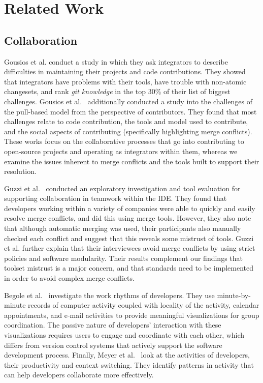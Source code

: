 
\section{Related Work}\label{related_work}

\subsection{Collaboration}

Gousios et al. \cite{integrator_perspective} conduct a study in which they ask integrators to describe difficulties in maintaining their projects and code contributions. 
They showed that integrators have problems with their tools, have trouble with non-atomic changesets, and rank \textit{git knowledge} in the top 30\% of their list of biggest challenges. 
Gousios et al.~\cite{gousios2016work} additionally conducted a study into the challenges of the pull-based model from the perspective of contributors. 
They found that most challenges relate to code contribution, the tools and model used to contribute, and the social aspects of contributing (specifically highlighting merge conflicts).
These works focus on the collaborative processes that go into contributing to open-source projects and operating as integrators within them, whereas we examine the issues inherent to merge conflicts and the tools built to support their resolution.

Guzzi et al.~\cite{Guzzi2015} conducted an exploratory investigation and tool evaluation for supporting collaboration in teamwork within the IDE.
They found that developers working within a variety of companies were able to quickly and easily resolve merge conflicts, and did this using merge tools.
However, they also note that although automatic merging was used, their participants also manually checked each conflict and suggest that this reveals some mistrust of tools.
Guzzi et al. further explain that their interviewees avoid merge conflicts by using strict policies and software modularity.
Their results complement our findings that toolset mistrust is a major concern, and that standards need to be implemented in order to avoid complex merge conflicts.

Begole et al.~\cite{begole_work_2002} investigate the work rhythms of developers.
They use minute-by-minute records of computer activity coupled with locality of the activity, calendar appointments, and e-mail activities to provide meaningful visualizations for group coordination.
The passive nature of developers' interaction with these visualizations requires users to engage and coordinate with each other, which differs from version control systems that actively support the software development process.
Finally, Meyer et al.~\cite{meyer_work_2017} look at the activities of developers, their productivity and context switching.
They identify patterns in activity that can help developers collaborate more effectively.

